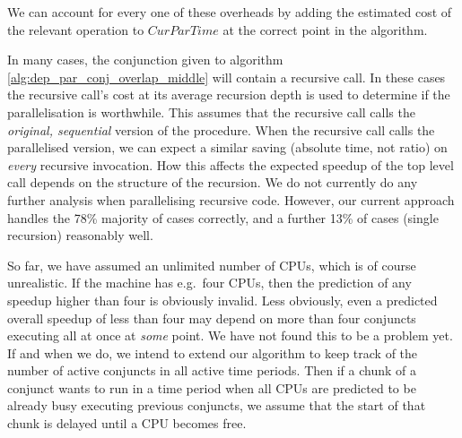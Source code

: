 \noindent
We can account for every one of these overheads
by adding the estimated cost of the relevant operation to $CurParTime$
at the correct point in the algorithm.

In many cases,
the conjunction given to algorithm \ref{alg:dep_par_conj_overlap_middle}
will contain a recursive call.
In these cases the recursive call's cost at its average recursion depth is
used to determine if the parallelisation is worthwhile.
This assumes that the recursive call
calls the \emph{original, sequential} version of the procedure.
When the recursive call calls the parallelised version,
we can expect a similar saving (absolute time, not ratio)
on \emph{every} recursive invocation.
How this affects the expected speedup of the top level call
depends on the structure of the recursion.
We do not currently do any further analysis when parallelising recursive
code.
However, our current approach handles the 78\% majority of cases correctly,
and a further 13\% of cases (single recursion) reasonably well.

So far, we have assumed an unlimited number of CPUs,
which is of course unrealistic.
If the machine has e.g.\ four CPUs,
then the prediction of any speedup higher than four is obviously invalid.
Less obviously,
even a predicted overall speedup of less than four may depend
on more than four conjuncts executing all at once at \emph{some} point.
We have not found this to be a problem yet.
If and when we do,
we intend to extend our algorithm to keep track
of the number of active conjuncts in all active time periods.
Then if a chunk of a conjunct wants to run in a time period
when all CPUs are predicted to be already busy executing previous conjuncts,
we assume that the start of that chunk is delayed until a CPU becomes free.

